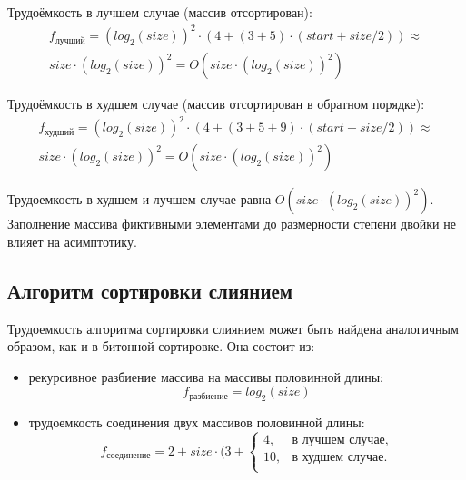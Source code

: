 Трудоёмкость в лучшем случае (массив отсортирован):
\begin{equation}
	\begin{array}{cc}
		f_{\text{лучший}} = (log_2{(size)})^2  \cdot (4 + (3 + 5) \cdot (start + size / 2)) \approx \\ size \cdot (log_2{(size)})^2 = O(size \cdot (log_2{(size)})^2)              
	\end{array}
\end{equation}

Трудоёмкость в худшем случае (массив отсортирован в обратном порядке):
\begin{equation}
	\begin{array}{cc}
		f_{\text{худший}} = (log_2{(size)})^2  \cdot (4 + (3 + 5 + 9) \cdot (start + size / 2)) \approx  \\ size \cdot (log_2{(size)})^2 = O(size \cdot (log_2{(size)})^2)              
	\end{array}
\end{equation}

Трудоемкость в худшем и лучшем случае равна $O(size \cdot (log_2{(size)})^2)$. Заполнение массива фиктивными элементами до размерности степени двойки не влияет на асимптотику.

\subsection{Алгоритм сортировки слиянием}
Трудоемкость алгоритма сортировки слиянием может быть найдена аналогичным образом, как и в битонной сортировке. Она состоит из:

\begin{itemize}
	\item рекурсивное разбиение массива на массивы половинной длины:
	\begin{equation}
		\label{worst_counting}
		f_{\text{разбиение}} = log_2{(size)}
	\end{equation}
	
	\item трудоемкость соединения двух массивов половинной длины:
	\begin{equation}
		\label{worst_counting}
		f_{\text{соединение}} = 2 + size \cdot (3 + \begin{cases}
			4, & \text{в лучшем случае},\\
			10, & \text{в худшем случае}.\\
		\end{cases}
	\end{equation}
\end{itemize}

